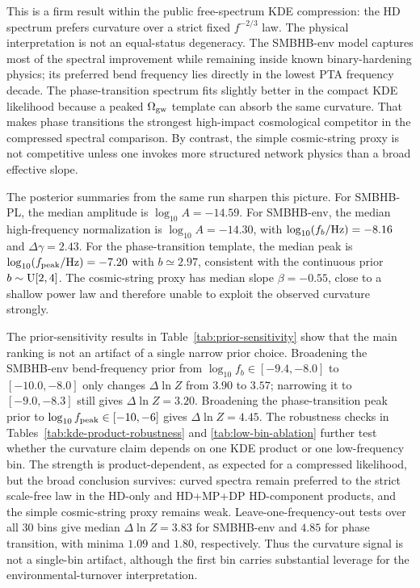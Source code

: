 \documentclass[symmetry,article,submit,pdftex,moreauthors]{Definitions/mdpi}
\begin{document}
This is a firm result within the public free-spectrum KDE compression: the HD spectrum prefers curvature over a strict fixed $f^{-2/3}$ law. The physical interpretation is not an equal-status degeneracy. The SMBHB-env model captures most of the spectral improvement while remaining inside known binary-hardening physics; its preferred bend frequency lies directly in the lowest PTA frequency decade. The phase-transition spectrum fits slightly better in the compact KDE likelihood because a peaked $\Omega_{\rm gw}$ template can absorb the same curvature. That makes phase transitions the strongest high-impact cosmological competitor in the compressed spectral comparison. By contrast, the simple cosmic-string proxy is not competitive unless one invokes more structured network physics than a broad effective slope.

The posterior summaries from the same run sharpen this picture. For SMBHB-PL, the median amplitude is $\log_{10}A=-14.59$. For SMBHB-env, the median high-frequency normalization is $\log_{10}A=-14.30$, with $\log_{10}(f_b/{\rm Hz})=-8.16$ and $\Delta\gamma=2.43$. For the phase-transition template, the median peak is $\log_{10}(f_{\rm peak}/{\rm Hz})=-7.20$ with $b\simeq2.97$, consistent with the continuous prior $b\sim{\rm U}[2,4]$. The cosmic-string proxy has median slope $\beta=-0.55$, close to a shallow power law and therefore unable to exploit the observed curvature strongly.

The prior-sensitivity results in Table~\ref{tab:prior-sensitivity} show that the main ranking is not an artifact of a single narrow prior choice. Broadening the SMBHB-env bend-frequency prior from $\log_{10} f_b\in[-9.4,-8.0]$ to $[-10.0,-8.0]$ only changes $\Delta\ln Z$ from $3.90$ to $3.57$; narrowing it to $[-9.0,-8.3]$ still gives $\Delta\ln Z=3.20$. Broadening the phase-transition peak prior to $\log_{10} f_{\rm peak}\in[-10,-6]$ gives $\Delta\ln Z=4.45$. The robustness checks in Tables~\ref{tab:kde-product-robustness} and \ref{tab:low-bin-ablation} further test whether the curvature claim depends on one KDE product or one low-frequency bin. The strength is product-dependent, as expected for a compressed likelihood, but the broad conclusion survives: curved spectra remain preferred to the strict scale-free law in the HD-only and HD+MP+DP HD-component products, and the simple cosmic-string proxy remains weak. Leave-one-frequency-out tests over all 30 bins give median $\Delta\ln Z=3.83$ for SMBHB-env and $4.85$ for phase transition, with minima $1.09$ and $1.80$, respectively. Thus the curvature signal is not a single-bin artifact, although the first bin carries substantial leverage for the environmental-turnover interpretation.
\end{document}
